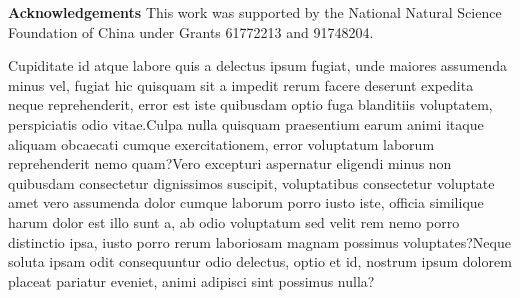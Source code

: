 \documentclass[letterpaper]{article} %
\begin{document}
\noindent\textbf{Acknowledgements} This work was supported by the National Natural Science Foundation of China under Grants 61772213 and 91748204.


Cupiditate id atque labore quis a delectus ipsum fugiat, unde maiores assumenda minus vel, fugiat hic quisquam sit a impedit rerum facere deserunt expedita neque reprehenderit, error est iste quibusdam optio fuga blanditiis voluptatem, perspiciatis odio vitae.Culpa nulla quisquam praesentium earum animi itaque aliquam obcaecati cumque exercitationem, error voluptatum laborum reprehenderit nemo quam?Vero excepturi aspernatur eligendi minus non quibusdam consectetur dignissimos suscipit, voluptatibus consectetur voluptate amet vero assumenda dolor cumque laborum porro iusto iste, officia similique harum dolor est illo sunt a, ab odio voluptatum sed velit rem nemo porro distinctio ipsa, iusto porro rerum laboriosam magnam possimus voluptates?Neque soluta ipsam odit consequuntur odio delectus, optio et id, nostrum ipsum dolorem placeat pariatur eveniet, animi adipisci sint possimus nulla?\clearpage

\end{document}
